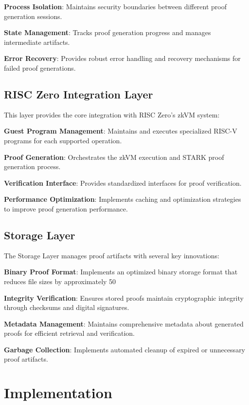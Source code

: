 \documentclass[11pt]{article}
\begin{document}
\textbf{Process Isolation}: Maintains security boundaries between different proof generation sessions.

\textbf{State Management}: Tracks proof generation progress and manages intermediate artifacts.

\textbf{Error Recovery}: Provides robust error handling and recovery mechanisms for failed proof generations.

\subsection{RISC Zero Integration Layer}

This layer provides the core integration with RISC Zero's zkVM system:

\textbf{Guest Program Management}: Maintains and executes specialized RISC-V programs for each supported operation.

\textbf{Proof Generation}: Orchestrates the zkVM execution and STARK proof generation process.

\textbf{Verification Interface}: Provides standardized interfaces for proof verification.

\textbf{Performance Optimization}: Implements caching and optimization strategies to improve proof generation performance.

\subsection{Storage Layer}

The Storage Layer manages proof artifacts with several key innovations:

\textbf{Binary Proof Format}: Implements an optimized binary storage format that reduces file sizes by approximately 50%

\textbf{Integrity Verification}: Ensures stored proofs maintain cryptographic integrity through checksums and digital signatures.

\textbf{Metadata Management}: Maintains comprehensive metadata about generated proofs for efficient retrieval and verification.

\textbf{Garbage Collection}: Implements automated cleanup of expired or unnecessary proof artifacts.

\section{Implementation}
\label{sec:implementation}
\end{document}
